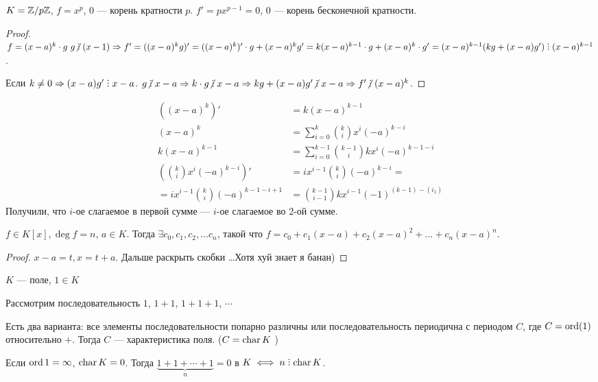  \begin{example}
     $K = \mathbb{Z} / p\mathbb{Z}$,  $f = x^p$, 0 --- корень кратности  $p$.  $f' = p x^{p-1} = 0$, $0$ --- корень бесконечной кратности.
\end{example}
\begin{proof}
    $f = (x-a)^k \cdot g\ g \centernot \divby (x-1) \Rightarrow f' = ((x-a)^k g)' = ((x-a)^k)' \cdot g + (x-a)^k g' = k(x-a)^{k-1} \cdot g + (x-a)^k \cdot g' = (x-a)^{k-1} (kg + (x-a)g') \divby (x-a)^{k-1}$. 

    Если $k \neq 0 \Rightarrow (x-a)g' \divby x-a$. $g \centernot \divby x-a \Rightarrow k \cdot g \centernot \divby x-a \Rightarrow kg + (x-a)g' \centernot \divby x-a \Rightarrow f' \centernot \divby (x-a)^k$. 
\end{proof}
\begin{lemma}
    \begin{align*}    
        ((x-a)^k)' &= k(x-a)^{k-1}\\
        (x-a)^k &= \sum_{i=0}^k \binom{k}{i} x^i (-a)^{k-i} \\
        k(x-a)^{k-1} &= \sum_{i=0}^{k-1} \binom{k-1}{i} kx^i(-a)^{k-1-i}\\
        (\binom{k}{i} x^i(-a)^{k-i})' &= ix^{i-1} \binom{k}{i} (-a)^{k-i} = \\
        = i x^{i-1} \binom{k}{i}(-a)^{k-1 - i + 1} &= \binom{k-1}{i-1}kx^{i-1}(-1)^{(k-1) - (i_1)}
    \end{align*}
    Получили, что $i$-ое слагаемое в первой сумме --- $i$-ое слагаемое во 2-ой сумме.
\end{lemma}
\begin{statement}
    $f \in K[x], \deg f = n$,  $a \in K$. Тогда  $\exists c_0, c_1,c_2,\ldots c_n$, такой что $f = c_0 + c_1(x-a) + c_2(x-a)^2 + \ldots + c_n(x-a)^n$.
\end{statement}
\begin{proof}
    $x-a = t, x = t+a$. Дальше раскрыть скобки \ldots Хотя хуй знает я банан)
\end{proof}
$K$ --- поле,  $1 \in K$

Рассмотрим последовательность $1$, $1 + 1$, $1 + 1 + 1$, $\cdots$

\begin{definition}
	Есть два варианта: все элементы последовательности попарно различны или последовательность периодична с периодом  $C$, где  $C = \operatorname{ord}(1)$ относительно  $+$. Тогда $C$ --- характеристика поля. ($C = \operatorname{char} K$ )
\end{definition}
Если $\operatorname{ord} 1 = \infty$, $\operatorname{char} K = 0$. Тогда $\underbrace{1 + 1 + \cdots + 1}_n = 0$ в  $K \iff n \divby \charr K$.

